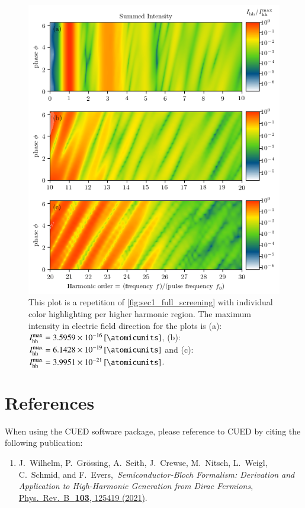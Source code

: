 \documentclass[11pt, a4paper]{scrartcl}
\newcommand{\paper}[4]{\item #1, \,\textit{#2}, \,\href{#3}{#4}.\\[-1.4em]}
\begin{document}
\begin{figure}[H]
    \centering
    \includegraphics[width=\textwidth]{phase=variable_full_split_plot.png}
    \caption{This plot is a repetition of \cref{fig:sec1_full_screening} with individual color
      highlighting per higher harmonic region. The maximum intensity in electric
      field direction for the plots is (a): $I_{\mathrm{hh}}^{\mathrm{max}} = \SI{3.5959e-16}{[\atomicunits]}$, 
      (b): $I_{\mathrm{hh}}^{\mathrm{max}} = \SI{6.1428e-19}{[\atomicunits]}$ and (c): 
      $I_{\mathrm{hh}}^{\mathrm{max}} = \SI{3.9951e-21}{[\atomicunits]}$.}
    \label{fig:sec1_full_screening_s}
\end{figure}

\section{References}
When using the CUED software package, please reference to CUED by citing the following publication:
\begin{enumerate}[leftmargin=*]

\paper{J.~Wilhelm, P.~Grössing, A.~Seith, J.~Crewse, M.~Nitsch, L.~Weigl, C.~Schmid, and F.~Evers}{Semi\-con\-duc\-tor-Bloch Formalism: Derivation and Application to High-Harmonic Generation from Dirac Fermions}{https://doi.org/10.1103/PhysRevB.103.125419}{ 
Phys.~Rev.~B~\,\textbf{103}, 125419 (2021)}
\label{Wilhelm2021}

\end{enumerate}
\end{document}
